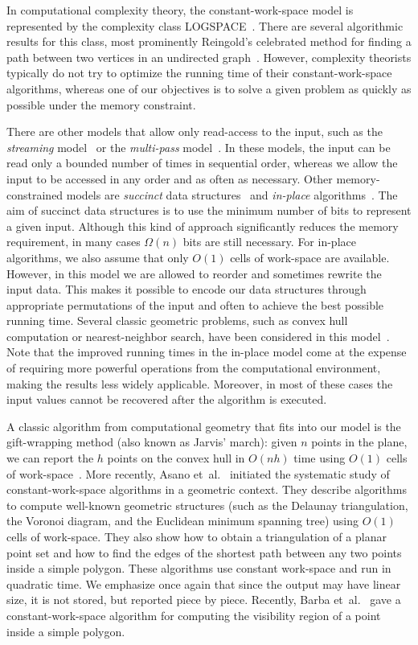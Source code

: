\documentclass[11pt,a4paper]{article}
\newcommand{\etal}{et~al.}
\begin{document}
In computational complexity theory, the constant-work-space model
is represented by the
complexity class LOGSPACE~\cite{AroraBa09}. There are several algorithmic
results for this class, most prominently Reingold's celebrated method for
finding a path between two vertices in an undirected
graph~\cite{Reingold08}. However, complexity theorists typically do not
try to optimize the running time of their constant-work-space algorithms,
whereas one of our objectives is to solve a given problem as quickly as
possible under the memory constraint.


There are other models that allow only read-access to the input, such as
the \emph{streaming} model~\cite{Muthukrishnan05} or the
\emph{multi-pass} model~\cite{ChanCh07}.
In these models, the input can be read only a bounded number of times
in sequential order, whereas we allow the input to be accessed in any order and
as often as necessary.
Other memory-constrained models are \emph{succinct}
data structures~\cite{JacoSucc89} and \emph{in-place}
algorithms~\cite{BronnimannIaKaMoMoTo04,BronnimannChCh04,ChanCh10,BronnimannCh06}.
The aim of succinct data structures is to use the minimum number of
bits to represent a given input. Although this kind of approach
significantly reduces the memory requirement,
in many cases $\Omega(n)$ bits are still necessary.
For in-place algorithms, we also assume that only $O(1)$ cells of work-space
are available. However, in this model we are  allowed to reorder and sometimes
rewrite the input data. This makes it possible to encode our data
structures through appropriate permutations of the input and often
to achieve the best possible running time. Several classic geometric problems,
such as convex hull computation or nearest-neighbor search, have
been considered in this
model~\cite{BronnimannIaKaMoMoTo04,BronnimannChCh04,ChanCh10,BronnimannCh06}.
Note that the improved running times in the in-place model come at
the expense of requiring more powerful operations from the computational
environment, making the results less widely applicable.
Moreover, in most of
these cases the input values cannot be recovered after the algorithm
is executed.

A classic algorithm from computational geometry that fits into
our model is the gift-wrapping method
(also known as Jarvis' march):
given $n$ points in the plane, we can report the $h$ points
on the convex hull in $O(n{h})$ time using $O(1)$ cells of
work-space~\cite{s-chc-04}.
More recently, Asano \etal~\cite{AsanoMuRoWa11} initiated
the systematic study of constant-work-space algorithms
in a geometric context.  They
describe algorithms to compute well-known geometric structures (such as the
Delaunay triangulation, the Voronoi diagram, and the Euclidean
minimum spanning tree) using $O(1)$ cells of work-space.
They also show how to obtain a triangulation of a planar point
set and how to find the edges of the shortest path between any two points
inside a simple polygon. These algorithms use constant work-space
and run in quadratic time.
We emphasize once again
that since the output may have linear size, it is not stored,
but reported piece by piece.
Recently, Barba \etal~\cite{BarKorLanSil11}
gave a constant-work-space algorithm
for computing the visibility
region of a point inside a simple polygon.
\end{document}
